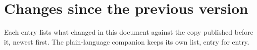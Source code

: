 \clearpage
\section*{Changes since the previous version}
Each entry lists what changed in this document against the copy published
before it, newest first. The plain-language companion keeps its own list,
entry for entry.

